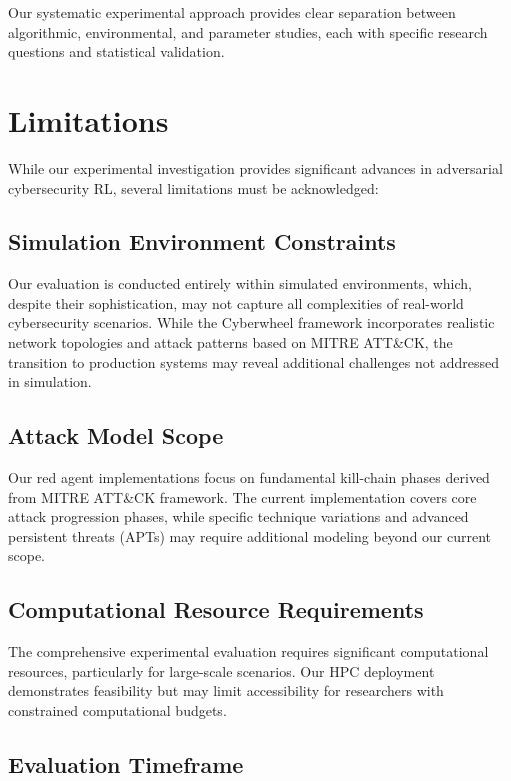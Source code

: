 \documentclass[12pt,oneside]{article}
\begin{document}
Our systematic experimental approach provides clear separation between algorithmic, environmental, and parameter studies, each with specific research questions and statistical validation.

\section{Limitations}

While our experimental investigation provides significant advances in adversarial cybersecurity RL, several limitations must be acknowledged:

\subsection{Simulation Environment Constraints}

Our evaluation is conducted entirely within simulated environments, which, despite their sophistication, may not capture all complexities of real-world cybersecurity scenarios. While the Cyberwheel framework incorporates realistic network topologies and attack patterns based on MITRE ATT\&CK, the transition to production systems may reveal additional challenges not addressed in simulation.

\subsection{Attack Model Scope}

Our red agent implementations focus on fundamental kill-chain phases derived from MITRE ATT\&CK framework. The current implementation covers core attack progression phases, while specific technique variations and advanced persistent threats (APTs) may require additional modeling beyond our current scope.

\subsection{Computational Resource Requirements}

The comprehensive experimental evaluation requires significant computational resources, particularly for large-scale scenarios. Our HPC deployment demonstrates feasibility but may limit accessibility for researchers with constrained computational budgets.

\subsection{Evaluation Timeframe}
\end{document}
